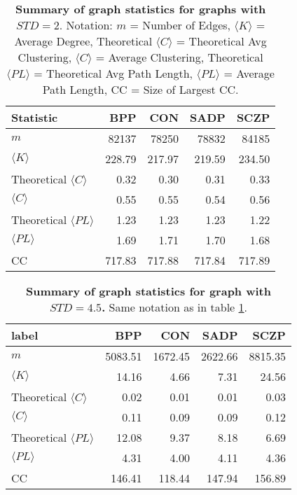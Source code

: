 \documentclass[fleqn,moreauthors,10pt]{ds_report}
\begin{document}
\begin{table}[h!]
\centering
\caption{\textbf{Summary of graph statistics for graphs with $STD=2$}. Notation:  $m$ = Number of Edges, $\langle K \rangle$ = Average Degree, Theoretical $\langle C \rangle$ = Theoretical Avg Clustering, $\langle C \rangle$ = Average Clustering, Theoretical $\langle PL \rangle$ = Theoretical Avg Path Length, $\langle PL \rangle$ = Average Path Length, CC = Size of Largest CC.}
\label{tab:graph_statistics_2}
\begin{tabular}{lrrrr}
\toprule
Statistic &       BPP &       CON &      SADP &      SCZP \\
\midrule
$m$                &  82137&  78250 &  78832 &  84185 \\
$\langle K \rangle$              &    228.79 &    217.97 &    219.59 &    234.50 \\
Theoretical $\langle C \rangle$  &      0.32 &      0.30 &      0.31 &      0.33 \\
$\langle C \rangle$              &      0.55 &      0.55 &      0.54 &      0.56 \\
Theoretical $\langle PL \rangle$ &      1.23 &      1.23 &      1.23 &      1.22 \\
$\langle PL \rangle$             &      1.69 &      1.71 &      1.70 &      1.68 \\
CC               &    717.83 &    717.88 &    717.84 &    717.89 \\
\bottomrule
\end{tabular}
\end{table}

\begin{table}[h!]
\centering
\caption{\textbf{Summary of graph statistics for graph with $STD=4.5$.} Same notation as in table \ref{tab:graph_statistics_2}.}
\label{tab:graph_statistics_4-5}
\begin{tabular}{lrrrr}
\toprule
label &      BPP &      CON &     SADP &     SCZP \\
\midrule
$m$                &  5083.51 &  1672.45 &  2622.66 &  8815.35 \\
$\langle K \rangle$              &    14.16 &     4.66 &     7.31 &    24.56 \\
Theoretical $\langle C \rangle$  &     0.02 &     0.01 &     0.01 &     0.03 \\
$\langle C \rangle$              &     0.11 &     0.09 &     0.09 &     0.12 \\
Theoretical $\langle PL \rangle$ &    12.08 &     9.37 &     8.18 &     6.69 \\
$\langle PL \rangle$             &     4.31 &     4.00 &     4.11 &     4.36 \\
CC               &   146.41 &   118.44 &   147.94 &   156.89 \\
\bottomrule
\end{tabular}
\end{table}
\end{document}
